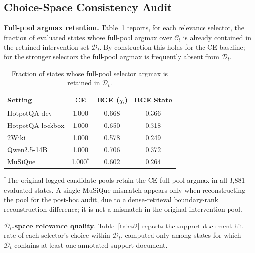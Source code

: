\documentclass[10pt]{article}
\newcommand{\stitle}[1]{\vspace{0.4em}\noindent\textbf{#1}\hspace{0.6em}}
\begin{document}
\subsection{Choice-Space Consistency Audit}
\label{sec:choicespace}

\stitle{Full-pool argmax retention.}
Table~\ref{tab:s1} reports, for each relevance selector, the fraction of
evaluated states whose full-pool argmax over $\mathcal{C}_t$ is already
contained in the retained intervention set $\mathcal{D}_t$. By construction
this holds for the CE baseline; for the stronger selectors the full-pool
argmax is frequently absent from $\mathcal{D}_t$.

\begin{table}[h]
\centering
\small
\caption{Fraction of states whose full-pool selector argmax is retained in
$\mathcal{D}_t$.}
\label{tab:s1}
\begin{tabular}{lccc}
\toprule
\textbf{Setting} & \textbf{CE} & \textbf{BGE ($q_t$)} & \textbf{BGE-State} \\
\midrule
HotpotQA dev     & 1.000     & 0.668 & 0.366 \\
HotpotQA lockbox & 1.000     & 0.650 & 0.318 \\
2Wiki            & 1.000     & 0.578 & 0.249 \\
Qwen2.5-14B      & 1.000     & 0.706 & 0.372 \\
MuSiQue          & 1.000$^*$ & 0.602 & 0.264 \\
\bottomrule
\end{tabular}
\end{table}
\noindent
$^*$The original logged candidate pools retain the CE full-pool argmax in all
3{,}881 evaluated states. A single MuSiQue mismatch appears only when
reconstructing the pool for the post-hoc audit, due to a dense-retrieval
boundary-rank reconstruction difference; it is not a mismatch in the original
intervention pool.

\stitle{$\mathcal{D}_t$-space relevance quality.}
Table~\ref{tab:s2} reports the support-document hit rate of each selector's
choice within $\mathcal{D}_t$, computed only among states for which
$\mathcal{D}_t$ contains at least one annotated support document.
\end{document}

